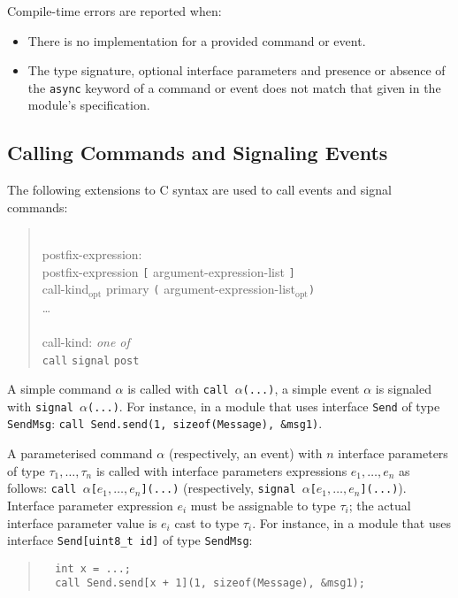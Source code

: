 \documentclass[11pt,letterpaper]{article}
\newcommand{\kw}[1]{{\tt #1}}
\newcommand{\code}[1]{{\tt #1}}
\newcommand{\opt}{$_{\mbox{opt}}$\xspace}
\newcommand{\grammarshift}{\vspace*{-.7cm}}
\newcommand{\grammarindent}{\hspace*{2cm}\= \\ \kill}
\begin{document}
Compile-time errors are reported when:
\begin{itemize}
\item There is no implementation for a provided command or event.
\item The type signature, optional interface parameters and presence or
absence of the \kw{async} keyword of a command or event does not match that
given in the module's specification.
\end{itemize}

\subsection{Calling Commands and Signaling Events}

The following extensions to C syntax are used to call events and signal
commands:
\begin{quote} \grammarshift \em \begin{tabbing}
\grammarindent
postfix-expression:\\
\>	postfix-expression \kw{[} argument-expression-list \kw{]}\\
\>	call-kind\opt primary \kw{(} argument-expression-list\opt \kw{)}\\
\>	\ldots
\\\\
call-kind: \emph{one of}\\
\>	\kw{call} \kw{signal} \kw{post}
\end{tabbing} \end{quote}

A simple command $\alpha$ is called with \code{call $\alpha$(...)}, a
simple event $\alpha$ is signaled with \code{signal $\alpha$(...)}. For
instance, in a module that uses interface \code{Send} of type \kw{SendMsg}:
\code{call Send.send(1, sizeof(Message), \&msg1)}.

A parameterised command $\alpha$ (respectively, an event) with $n$
interface parameters of type $\tau_1, \ldots, \tau_n$ is called with
interface parameters expressions $e_1, \ldots, e_n$ as follows: \code{call
$\alpha$[$e_1, \ldots, e_n$](...)}  (respectively, \code{signal
$\alpha$[$e_1, \ldots, e_n$](...)}). Interface parameter expression $e_i$
must be assignable to type $\tau_i$; the actual interface parameter value
is $e_i$ cast to type $\tau_i$. For instance, in a module that uses
interface \code{Send[uint8\_t id]} of type \kw{SendMsg}:

\begin{quote} \begin{verbatim}
  int x = ...;
  call Send.send[x + 1](1, sizeof(Message), &msg1);
\end{verbatim} \end{quote}
\end{document}
